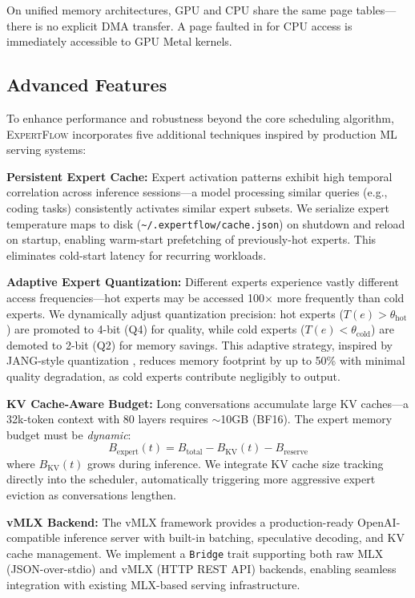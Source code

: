 \documentclass[11pt]{article}
\begin{document}
On unified memory architectures, GPU and CPU share the same page tables—there is no explicit DMA transfer. A page faulted in for CPU access is immediately accessible to GPU Metal kernels.

\subsection{Advanced Features}

To enhance performance and robustness beyond the core scheduling algorithm, \textsc{ExpertFlow} incorporates five additional techniques inspired by production ML serving systems:

\textbf{Persistent Expert Cache:} Expert activation patterns exhibit high temporal correlation across inference sessions—a model processing similar queries (e.g., coding tasks) consistently activates similar expert subsets. We serialize expert temperature maps to disk (\texttt{\textasciitilde/.expertflow/cache.json}) on shutdown and reload on startup, enabling warm-start prefetching of previously-hot experts. This eliminates cold-start latency for recurring workloads.

\textbf{Adaptive Expert Quantization:} Different experts experience vastly different access frequencies—hot experts may be accessed 100$\times$ more frequently than cold experts. We dynamically adjust quantization precision: hot experts ($T(e) > \theta_{\text{hot}}$) are promoted to 4-bit (Q4) for quality, while cold experts ($T(e) < \theta_{\text{cold}}$) are demoted to 2-bit (Q2) for memory savings. This adaptive strategy, inspired by JANG-style quantization \cite{jangq2026}, reduces memory footprint by up to 50\% with minimal quality degradation, as cold experts contribute negligibly to output.

\textbf{KV Cache-Aware Budget:} Long conversations accumulate large KV caches—a 32k-token context with 80 layers requires $\sim$10GB (BF16). The expert memory budget must be \textit{dynamic}:
\begin{equation}
    B_{\text{expert}}(t) = B_{\text{total}} - B_{\text{KV}}(t) - B_{\text{reserve}}
\end{equation}
where $B_{\text{KV}}(t)$ grows during inference. We integrate KV cache size tracking directly into the scheduler, automatically triggering more aggressive expert eviction as conversations lengthen.

\textbf{vMLX Backend:} The vMLX framework \cite{vmlx2026} provides a production-ready OpenAI-compatible inference server with built-in batching, speculative decoding, and KV cache management. We implement a \texttt{Bridge} trait supporting both raw MLX (JSON-over-stdio) and vMLX (HTTP REST API) backends, enabling seamless integration with existing MLX-based serving infrastructure.
\end{document}
